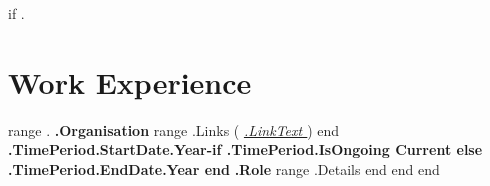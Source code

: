 {{if .}}
\section{Work Experience}
  \resumeSubHeadingListStart
    {{range .}}
\resumeSubheading
      {\textbf{ {{.Organisation}} }   {{range .Links}}  ( \href{ {{.LinkURL}} } {\emph{\underline{ {{.LinkText}} } } } )}
      {{end}}
      {\textbf{ {{.TimePeriod.StartDate.Year}}-{{if .TimePeriod.IsOngoing}} Current {{else}} {{.TimePeriod.EndDate.Year}} {{end}} } }
      {\textbf{ {{.Role}} }}{}
      \resumeItemListStart
      {{range .Details}}
    {{end}}
      \resumeItemListEnd
      {{end}}
\vspace{-16pt}
{{end}}